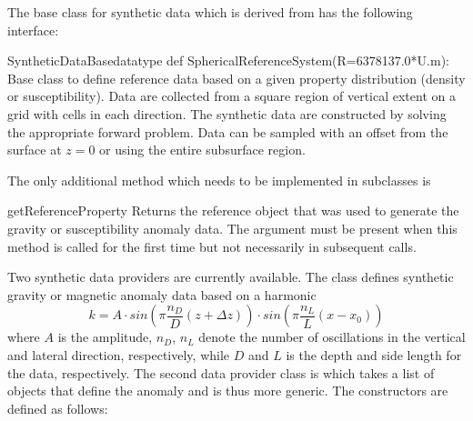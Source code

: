 The base class for synthetic data which is derived from 
has the following interface:

\begin{classdesc}{SyntheticDataBase}{datatype%
def SphericalReferenceSystem(R=6378137.0*U.m):
}
Base class to define reference data based on a given property distribution
(density or susceptibility). Data are collected from a square region of
vertical extent  on a grid with 
cells in each direction.
The synthetic data are constructed by solving the appropriate forward problem.
Data can be sampled with an offset from the surface at $z=0$ or using the
entire subsurface region.
\end{classdesc}

\vspace{1em}\noindent The only additional method which needs to be implemented
in subclasses is
\begin{methoddesc}[SyntheticDataBase]{getReferenceProperty}{
}
Returns the reference \Data object that was used to generate the gravity or
susceptibility anomaly data. The  argument must be present
when this method is called for the first time but not necessarily in
subsequent calls.
\end{methoddesc}

\vspace{1em}\noindent Two synthetic data providers are currently available.
The class  defines synthetic gravity or magnetic anomaly
data based on a harmonic
\begin{equation}\label{eq:synthdata}
    k=A\cdot sin\left(\pi \frac{n_D}{D} (z+\Delta z)\right) \cdot%
        sin\left(\pi \frac{n_L}{L} (x - x_0)\right)
\end{equation}
where $A$ is the amplitude, $n_D$, $n_L$ denote the number of oscillations in
the vertical and lateral direction, respectively, while $D$ and $L$ is the
depth and side length for the data, respectively.
The second data provider class is  which takes a
list of  objects that define the anomaly and is thus more
generic.
The constructors are defined as follows:

